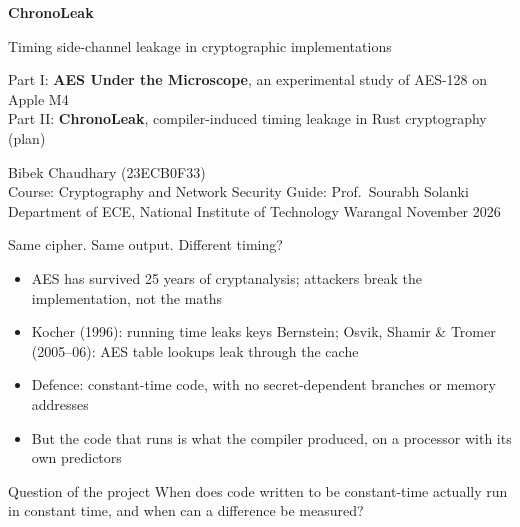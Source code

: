 \documentclass[aspectratio=169,11pt]{beamer}
\begin{document}
{
\begin{frame}[plain]
\color{white}
\vspace{0.6cm}
{\Huge\bfseries ChronoLeak}\par\vspace{0.15cm}
{\Large Timing side-channel leakage in cryptographic implementations}\par\vspace{0.5cm}
{\normalsize\color{white!85}Part I: \textbf{AES Under the Microscope}, an experimental study of AES-128 on Apple M4\\
Part II: \textbf{ChronoLeak}, compiler-induced timing leakage in Rust cryptography (plan)}\par
\vspace{0.7cm}
{\small Bibek Chaudhary (23ECB0F33)\\ Course: Cryptography and Network Security \quad Guide: Prof.\ Sourabh Solanki\\
Department of ECE, National Institute of Technology Warangal \quad November 2026}
\vfill
\end{frame}}

\begin{frame}{Same cipher. Same output. Different timing?}
\begin{itemize}
  \item AES has survived 25 years of cryptanalysis; attackers break the \alert{implementation}, not the maths
  \item Kocher (1996): running time leaks keys \quad Bernstein; Osvik, Shamir \& Tromer (2005--06): AES table lookups leak through the cache
  \item Defence: \alert{constant-time} code, with no secret-dependent branches or memory addresses
  \item But the code that runs is what the \alert{compiler} produced, on a processor with its own \alert{predictors}
\end{itemize}
\vspace{0.3cm}
\begin{block}{Question of the project}
When does code written to be constant-time actually run in constant time, and when can a difference be measured?
\end{block}
\end{frame}
\end{document}
